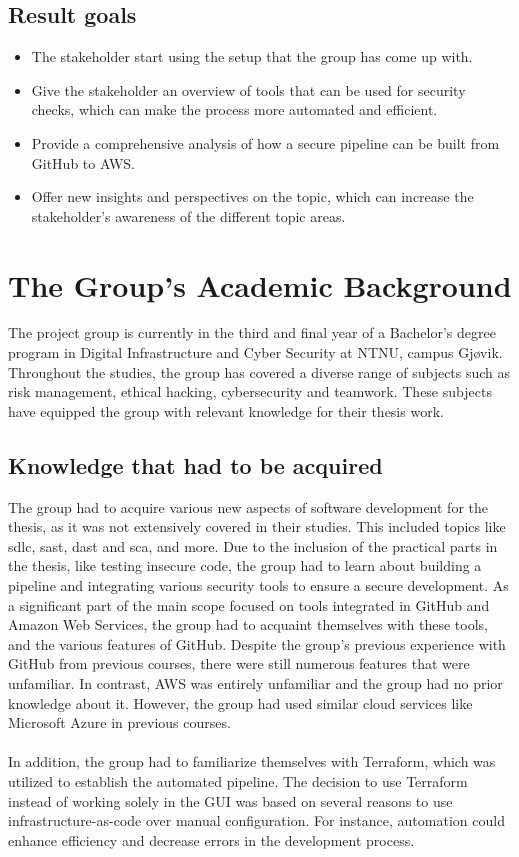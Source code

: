 \subsection{Result goals}
\begin{itemize}
    \item The stakeholder start using the setup that the group has come up with. 
    \item Give the stakeholder an overview of tools that can be used for security checks, which can make the process more automated and efficient. 
    \item Provide a comprehensive analysis of how a secure pipeline can be built from GitHub to AWS. 
    \item Offer new insights and perspectives on the topic, which can increase the stakeholder's awareness of the different topic areas. 
\end{itemize}

  

\section{The Group’s Academic Background}
The project group is currently in the third and final year of a Bachelor's degree program in Digital Infrastructure and Cyber Security at NTNU, campus Gjøvik. Throughout the studies, the group has covered a diverse range of subjects such as risk management, ethical hacking, cybersecurity and teamwork. These subjects have equipped the group with relevant knowledge for their thesis work.

\subsection{Knowledge that had to be acquired}
\label{section: Knowledge that had to be acquired}
The group had to acquire various new aspects of software development for the thesis, as it was not extensively covered in their studies. This included topics like \acrshort{sdlc}, \acrlong{sast}, \acrlong{dast} and \acrlong{sca}, and more. Due to the inclusion of the practical parts in the thesis, like testing insecure code, the group had to learn about building a pipeline and integrating various security tools to ensure a secure development. As a significant part of the main scope focused on tools integrated in GitHub and Amazon Web Services, the group had to acquaint themselves with these tools, and the various features of GitHub. Despite the group's previous experience with GitHub from previous courses, there were still numerous features that were unfamiliar. In contrast, AWS was entirely unfamiliar and the group had no prior knowledge about it. However, the group had used similar cloud services like Microsoft Azure in previous courses.
\\~\\
In addition, the group had to familiarize themselves with Terraform, which was utilized to establish the automated pipeline. The decision to use Terraform instead of working solely in the GUI was based on several reasons to use infrastructure-as-code over manual configuration. For instance, automation could enhance efficiency and decrease errors in the development process.

